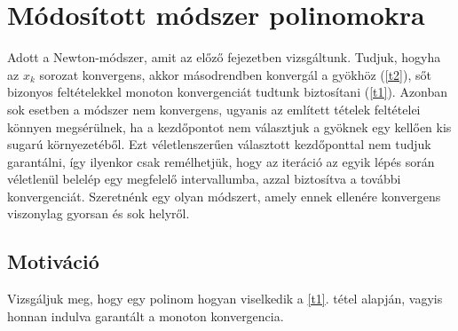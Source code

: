 \documentclass[a4paper,12pt]{report}
\begin{document}










%
%
    
    
    
    
    
    
    
    
    
    
    
    
\chapter{Módosított módszer polinomokra}
		Adott a Newton-módszer, amit az előző fejezetben vizsgáltunk. Tudjuk, hogyha az $x_k$ sorozat konvergens, akkor másodrendben konvergál a gyökhöz (\ref{t2}), sőt bizonyos feltételekkel monoton konvergenciát tudtunk biztosítani (\ref{t1}). Azonban sok esetben a módszer nem konvergens, ugyanis az említett tételek feltételei könnyen megsérülnek, ha a kezdőpontot nem választjuk a gyöknek egy kellően kis sugarú környezetéből. Ezt véletlenszerűen választott kezdőponttal nem tudjuk garantálni, így ilyenkor csak remélhetjük, hogy az iteráció az egyik lépés során véletlenül belelép egy megfelelő intervallumba, azzal biztosítva a további konvergenciát. Szeretnénk egy olyan módszert, amely ennek ellenére konvergens viszonylag gyorsan és sok helyről.































		\section{Motiváció}
			Vizsgáljuk meg, hogy egy polinom hogyan viselkedik a \ref{t1}. tétel alapján, vagyis honnan indulva garantált a monoton konvergencia.
			
\end{document}
